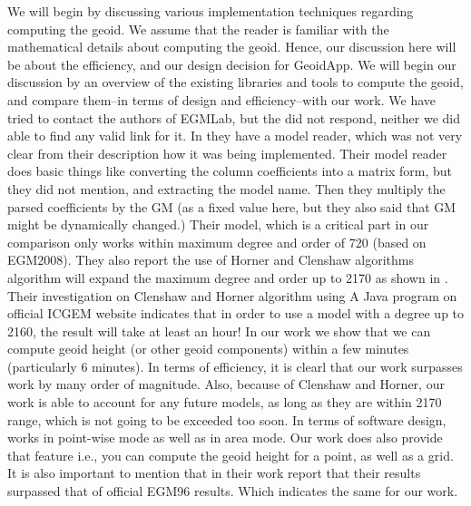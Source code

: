 We will begin by discussing various implementation techniques regarding computing the geoid. We assume that the reader is familiar with the mathematical details about computing the geoid. Hence, our discussion here will be about the efficiency, and our design decision for GeoidApp. We will begin our discussion by an overview of the existing libraries and tools to compute the geoid, and compare them--in terms of design and efficiency--with our work. We have tried to contact the authors of EGMLab, but the did not respond, neither we did able to find any valid link for it. In \cite{egmlab} they have a model reader, which was not very clear from their description how it was being implemented. Their model reader does basic things like converting the column coefficients into a matrix form, but they did not mention, and extracting the model name. Then they multiply the parsed coefficients by the GM (as a fixed value here, but they also said that GM might be dynamically changed.) Their model, which is a critical part in our comparison only works within maximum degree and order of 720 (based on EGM2008). They also report the use of Horner and Clenshaw algorithms algorithm will expand the maximum degree and order up to 2170 as shown in \cite{holmes}. Their investigation on Clenshaw and Horner algorithm using A Java program on official ICGEM website indicates that in order to use a model with a degree up to 2160, the result will take at least an hour! In our work we show that we can compute geoid height (or other geoid components) within a few minutes (particularly 6 minutes). In terms of efficiency, it is clearl that our work surpasses \cite{egmlab} work by many order of magnitude. Also, because of Clenshaw and Horner, our work is able to account for any future models, as long as they are within 2170 range, which is not going to be exceeded too soon. In terms of software design, \cite{egmlab} works in point-wise mode as well as in area mode. Our work does also provide that feature i.e., you can compute the geoid height for a point, as well as a grid. It is also important to mention that \cite{egmlab} in their work report that their results surpassed that of official EGM96 results. Which indicates the same for our work.
\\
